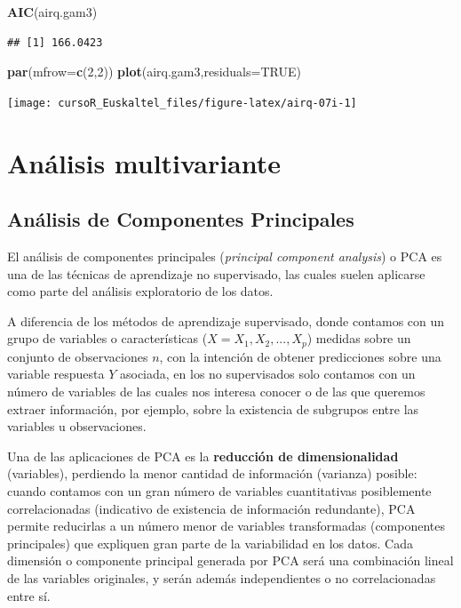 \documentclass[]{book}
\newenvironment{Shaded}{\begin{snugshade}}{\end{snugshade}}
\newcommand{\KeywordTok}[1]{\textcolor[rgb]{0.13,0.29,0.53}{\textbf{#1}}}
\newcommand{\DataTypeTok}[1]{\textcolor[rgb]{0.13,0.29,0.53}{#1}}
\newcommand{\DecValTok}[1]{\textcolor[rgb]{0.00,0.00,0.81}{#1}}
\newcommand{\OtherTok}[1]{\textcolor[rgb]{0.56,0.35,0.01}{#1}}
\newcommand{\NormalTok}[1]{#1}
\begin{document}
\begin{Shaded}
\begin{Highlighting}[]
\KeywordTok{AIC}\NormalTok{(airq.gam3)}
\end{Highlighting}
\end{Shaded}

\begin{verbatim}
## [1] 166.0423
\end{verbatim}

\begin{Shaded}
\begin{Highlighting}[]
\KeywordTok{par}\NormalTok{(}\DataTypeTok{mfrow=}\KeywordTok{c}\NormalTok{(}\DecValTok{2}\NormalTok{,}\DecValTok{2}\NormalTok{))}
\KeywordTok{plot}\NormalTok{(airq.gam3,}\DataTypeTok{residuals=}\OtherTok{TRUE}\NormalTok{)}
\end{Highlighting}
\end{Shaded}

\begin{center}\texttt{[image: cursoR\_Euskaltel\_files/figure-latex/airq-07i-1]} \end{center}

\chapter{Análisis multivariante}\label{analisis-multivariante}

\section{Análisis de Componentes
Principales}\label{analisis-de-componentes-principales}

El análisis de componentes principales (\emph{principal component
analysis}) o PCA es una de las técnicas de aprendizaje no supervisado,
las cuales suelen aplicarse como parte del análisis exploratorio de los
datos.

A diferencia de los métodos de aprendizaje supervisado, donde contamos
con un grupo de variables o características (\(X=X_1,X_2,...,X_p\))
medidas sobre un conjunto de observaciones \(n\), con la intención de
obtener predicciones sobre una variable respuesta \(Y\) asociada, en los
no supervisados solo contamos con un número de variables de las cuales
nos interesa conocer o de las que queremos extraer información, por
ejemplo, sobre la existencia de subgrupos entre las variables u
observaciones.

Una de las aplicaciones de PCA es la \textbf{reducción de
dimensionalidad} (variables), perdiendo la menor cantidad de información
(varianza) posible: cuando contamos con un gran número de variables
cuantitativas posiblemente correlacionadas (indicativo de existencia de
información redundante), PCA permite reducirlas a un número menor de
variables transformadas (componentes principales) que expliquen gran
parte de la variabilidad en los datos. Cada dimensión o componente
principal generada por PCA será una combinación lineal de las variables
originales, y serán además independientes o no correlacionadas entre sí.
\end{document}
